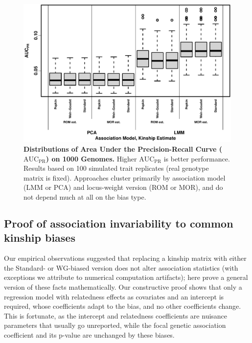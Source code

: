 \documentclass[11pt]{article}
\newcommand{\auc}{\text{AUC}_\text{PR}}
\begin{document}
\begin{figure}[bp!]
  \centering
  \includegraphics[width=\textwidth]{tgp-nygc-autosomes_ld_prune_1000kb_0.3_maf-0.01/auc.pdf}
  \caption{
    {\bf Distributions of Area Under the Precision-Recall Curve ($\auc$) on 1000 Genomes.}
    Higher $\auc$ is better performance.
    Results based on 100 simulated trait replicates (real genotype matrix is fixed).
    Approaches cluster primarily by association model (LMM or PCA) and locus-weight version (ROM or MOR), and do not depend much at all on the bias type.
  }
  \label{fig:auc_real}
\end{figure}

\subsection{Proof of association invariability to common kinship biases}

Our empirical observations suggested that replacing a kinship matrix with either the Standard- or WG-biased version does not alter association statistics (with exceptions we attribute to numerical computation artifacts); here prove a general version of these facts mathematically.
Our constructive proof shows that only a regression model with relatedness effects as covariates and an intercept is required, whose coefficients adapt to the bias, and no other coefficients change.
This is fortunate, as the intercept and relatedness coefficients are nuisance parameters that usually go unreported, while the focal genetic association coefficient and its p-value are unchanged by these biases.
\end{document}
